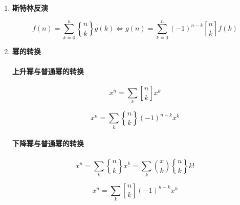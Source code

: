 \documentclass[a4paper, twoside]{article}
\begin{document}
\begin{enumerate}
            $$ {n \brace k} = \frac 1 {k!} \sum_{i = 0} ^ k (-1) ^ i {k \choose i} (k - i) ^ n = \sum_{i = 0} ^ k \frac {(-1) ^ i} {i!} \frac {(k - i) ^ n} {(k - i)!} $$
            
            \paragraph{求同一行} 显然是卷积形式，FFT。
            
            \paragraph{求同一列} EGF：
            
            $$ \sum_{n = 0} ^ \infty {n \brace k} \frac {x ^ n} {n!} = \frac {\left(e ^ x - 1\right) ^ k} {k!} = \frac {x ^ k} {k!} \left( \frac {e ^ x - 1} x \right) ^ k $$
            
            OGF：
            
            $$ \sum_{n = 0} ^ \infty {n \brace k} x ^ n = x ^ k \left(\prod_{i = 1} ^ k (1 - i x)\right) ^ {-1} $$
            
            \item \textbf{斯特林反演}
            
            $$ f(n) = \sum_{k = 0} ^ n {n \brace k} g(k) \iff g(n) = \sum_{k = 0} ^ n (-1) ^ {n - k} {n \brack k} f(k) $$
            
            \item \textbf{幂的转换}
            
            \paragraph{上升幂与普通幂的转换}
            
            $$ x^{\overline{n}}=\sum_{k} {n \brack k} x^k $$
            
            $$ x^n=\sum_{k} {n \brace k} (-1)^{n-k} x^{\overline{k}} $$
            
            \paragraph{下降幂与普通幂的转换}
            
            $$ x^n=\sum_{k} {n \brace k} x^{\underline{k}} = \sum_{k} {x \choose k} {n \brace k} k! $$
            
            $$ x^{\underline{n}}=\sum_{k} {n \brack k} (-1)^{n-k} x^k $$
            

\end{enumerate}
\end{document}
